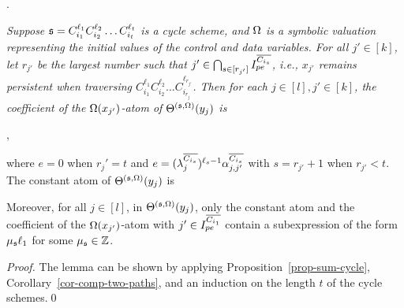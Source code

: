 \begin{appendix}
.
{\it 
	Suppose ${\mathfrak{s} }=C_{i_1}^{\ell_1} C_{i_2}^{\ell_2} \dots C_{i_t}^{\ell_t}$ is a cycle scheme, and $\Omega$ is a symbolic valuation representing the initial values of the control and data variables. 
	For all $j'\in[k]$, let $r_{j'}$ be the largest number such that $j'\in\bigcap_{s\in[r_{j'}]} I^{\overline{C_{i_{s}}}}_{pe}$, i.e., $x_{j'}$ remains persistent when traversing $C_{i_1}^{\ell_1} C_{i_2}^{\ell_2} \dots C_{i_{r_j}}^{\ell_{r_{j'}}}$.
	Then for each $j\in [l], j' \in[k]$, the coefficient of the $\Omega(x_{j'})$-atom of $\Theta^{({\mathfrak{s} },\Omega)}(y_j)$ is 
	\begin{center}
		,
	\end{center}
	where $e=0$ when $r_j'=t$ and $e=(\lambda^{\overline{C_{i_s}}}_{j})^{\ell_s-1} \alpha^{\overline{C_{i_{s}}}}_{j,j'}$ with $s=r_{j'}+1$ when $r_{j'}<t$.\\
	The constant atom of $\Theta^{({\mathfrak{s} },\Omega)}(y_j)$ is 
	\begin{center}
	\end{center}
	Moreover, for all $j \in [l]$, in $\Theta^{({\mathfrak{s} },\Omega)}(y_j)$, only the constant atom and the coefficient of the $\Omega(x_{j'})$-atom with $j' \in  I^{\overline{C_{i_{1}}}}_{pe}$ contain a subexpression of the form $ \mu_{\mathfrak{s} } \ell_1$ for some $\mu_{\mathfrak{s} }\in {\mathbb{Z} }$.
}

\begin{proof}
The lemma can be shown by applying Proposition~\ref{prop-sum-cycle}, Corollary~\ref{cor-comp-two-paths}, and an induction on the length $t$ of the cycle schemes.\qed
\end{proof}


\smallskip



\end{appendix}

